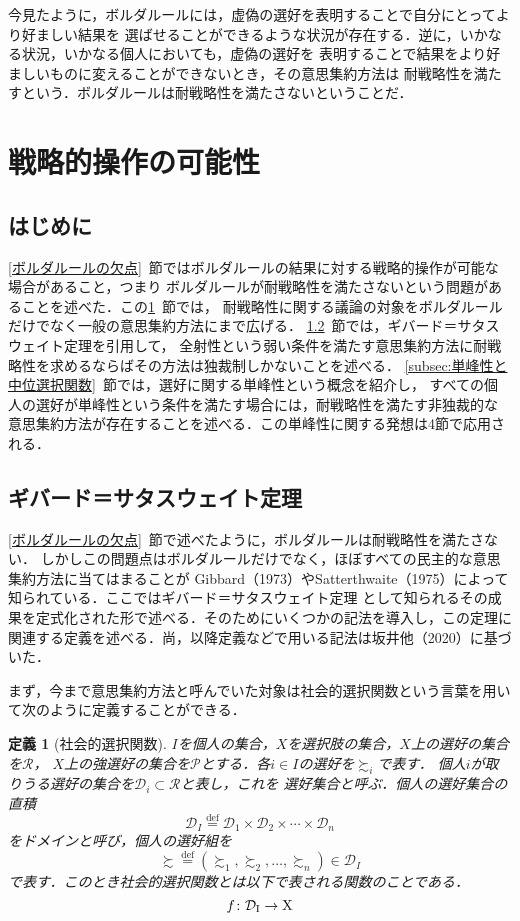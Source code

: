 \documentclass[dvipdfmx]{jsarticle}
\newtheorem{definition}{定義}[section]
\begin{document}
今見たように，ボルダルールには，虚偽の選好を表明することで自分にとってより好ましい結果を
選ばせることができるような状況が存在する．逆に，いかなる状況，いかなる個人においても，虚偽の選好を
表明することで結果をより好ましいものに変えることができないとき，その意思集約方法は
耐戦略性を満たすという．ボルダルールは耐戦略性を満たさないということだ．


\newpage
\section{戦略的操作の可能性}\label{sec:戦略的操作の可能性}
\subsection{はじめに}
\ref{ボルダルールの欠点}~節ではボルダルールの結果に対する戦略的操作が可能な場合があること，つまり
ボルダルールが耐戦略性を満たさないという問題があることを述べた．この\ref{sec:戦略的操作の可能性}~節では，
耐戦略性に関する議論の対象をボルダルールだけでなく一般の意思集約方法にまで広げる．
\ref{subsec:ギバード＝サタスウェイト定理}~節では，ギバード＝サタスウェイト定理を引用して，
全射性という弱い条件を満たす意思集約方法に耐戦略性を求めるならばその方法は独裁制しかないことを述べる．
\ref{subsec:単峰性と中位選択関数}~節では，選好に関する単峰性という概念を紹介し，
すべての個人の選好が単峰性という条件を満たす場合には，耐戦略性を満たす非独裁的な
意思集約方法が存在することを述べる．この単峰性に関する発想は4節で応用される．

\subsection{ギバード＝サタスウェイト定理}\label{subsec:ギバード＝サタスウェイト定理}
\ref{ボルダルールの欠点}~節で述べたように，ボルダルールは耐戦略性を満たさない．
しかしこの問題点はボルダルールだけでなく，ほぼすべての民主的な意思集約方法に当てはまることが
Gibbard（1973）やSatterthwaite（1975）によって知られている．ここではギバード＝サタスウェイト定理
として知られるその成果を定式化された形で述べる．そのためにいくつかの記法を導入し，この定理に
関連する定義を述べる．尚，以降定義などで用いる記法は坂井他（2020）に基づいた．

まず，今まで意思集約方法と呼んでいた対象は社会的選択関数という言葉を用いて次のように定義することができる．

\begin{definition}[社会的選択関数]
  $I$を個人の集合，$X$を選択肢の集合，$X$上の選好の集合を$\mathcal{R}$，
  $X$上の強選好の集合を$\mathcal{P}$とする．各$i \in I$の選好を$\succsim_i$で表す．
  個人$i$が取りうる選好の集合を$\mathcal{D}_i \subset \mathcal{R}$と表し，これを
  選好集合と呼ぶ．個人の選好集合の直積
  \[
    \mathcal{D}_I \stackrel{\mathrm{def}}{=} \mathcal{D}_1 \times
    \mathcal{D}_2 \times \cdots \times \mathcal{D}_n
  \]
  をドメインと呼び，個人の選好組を
  \[
    \succsim \stackrel{\mathrm{def}}{=} (\succsim_1, \succsim_2, \ldots, \succsim_n)
      \in \mathcal{D}_I
  \]
  で表す．このとき社会的選択関数とは以下で表される関数のことである．
  \[
    {\mathnormal{f}}\colon \mathcal{D}_{\mathrm{I}} \to \mathrm{X}
  \]
\end{definition}
\end{document}
